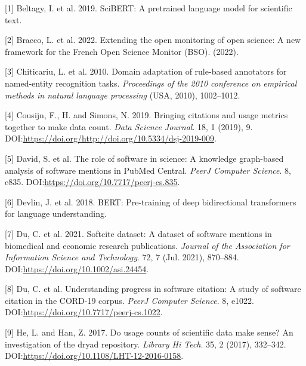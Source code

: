 \documentclass[
]{article}
\newenvironment{cslreferences}%
  {}%
  {\par}
\begin{document}
\hypertarget{refs}{}
\begin{cslreferences}
\leavevmode\hypertarget{ref-beltagy2019scibert}{}%
{[}1{]} Beltagy, I. et al. 2019. SciBERT: A pretrained language model
for scientific text.

\leavevmode\hypertarget{ref-bracco_extending_2022}{}%
{[}2{]} Bracco, L. et al. 2022. Extending the open monitoring of open
science: A new framework for the French Open Science Monitor (BSO).
(2022).

\leavevmode\hypertarget{ref-10.5555ux2f1870658.1870756}{}%
{[}3{]} Chiticariu, L. et al. 2010. Domain adaptation of rule-based
annotators for named-entity recognition tasks. \emph{Proceedings of the
2010 conference on empirical methods in natural language processing}
(USA, 2010), 1002--1012.

\leavevmode\hypertarget{ref-10.5334ux2fdsj-2019-009}{}%
{[}4{]} Cousijn, F., H. and Simons, N. 2019. Bringing citations and
usage metrics together to make data count. \emph{Data Science Journal}.
18, 1 (2019), 9.
DOI:\url{https://doi.org/http://doi.org/10.5334/dsj-2019-009}.

\leavevmode\hypertarget{ref-10.7717ux2fpeerj-cs.835}{}%
{[}5{]} David, S. et al. The role of software in science: A knowledge
graph-based analysis of software mentions in PubMed Central. \emph{PeerJ
Computer Science}. 8, e835.
DOI:\url{https://doi.org/10.7717/peerj-cs.835}.

\leavevmode\hypertarget{ref-devlin2018bert}{}%
{[}6{]} Devlin, J. et al. 2018. BERT: Pre-training of deep bidirectional
transformers for language understanding.

\leavevmode\hypertarget{ref-du_softcite_2021}{}%
{[}7{]} Du, C. et al. 2021. Softcite dataset: A dataset of software
mentions in biomedical and economic research publications. \emph{Journal
of the Association for Information Science and Technology}. 72, 7 (Jul.
2021), 870--884. DOI:\url{https://doi.org/10.1002/asi.24454}.

\leavevmode\hypertarget{ref-du_peerj_2022}{}%
{[}8{]} Du, C. et al. Understanding progress in software citation: A
study of software citation in the CORD-19 corpus. \emph{PeerJ Computer
Science}. 8, e1022. DOI:\url{https://doi.org/10.7717/peerj-cs.1022}.

\leavevmode\hypertarget{ref-he_han_2017}{}%
{[}9{]} He, L. and Han, Z. 2017. Do usage counts of scientific data make
sense? An investigation of the dryad repository. \emph{Library Hi Tech}.
35, 2 (2017), 332--342.
DOI:\url{https://doi.org/10.1108/LHT-12-2016-0158}.


\end{cslreferences}
\end{document}
